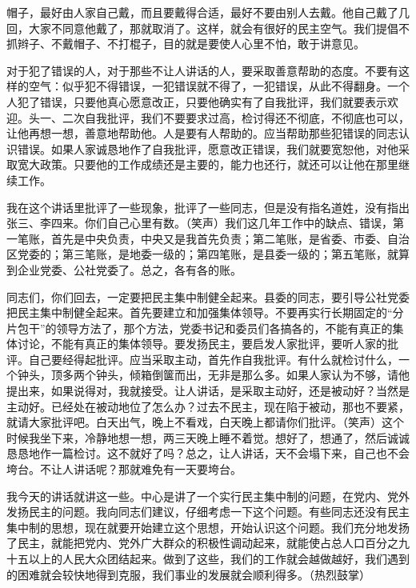 帽子，最好由人家自己戴，而且要戴得合适，最好不要由别人去戴。他自己戴了几回，大家不同意他戴了，那就取消了。这样，就会有很好的民主空气。我们提倡不抓辫子、不戴帽子、不打棍子，目的就是要使人心里不怕，敢于讲意见。

对于犯了错误的人，对于那些不让人讲话的人，要采取善意帮助的态度。不要有这样的空气：似乎犯不得错误，一犯错误就不得了，一犯错误，从此不得翻身。一个人犯了错误，只要他真心愿意改正，只要他确实有了自我批评，我们就要表示欢迎。头一、二次自我批评，我们不要要求过高，检讨得还不彻底，不彻底也可以，让他再想一想，善意地帮助他。人是要有人帮助的。应当帮助那些犯错误的同志认识错误。如果人家诚恳地作了自我批评，愿意改正错误，我们就要宽恕他，对他采取宽大政策。只要他的工作成绩还是主要的，能力也还行，就还可以让他在那里继续工作。

我在这个讲话里批评了一些现象，批评了一些同志，但是没有指名道姓，没有指出张三、李四来。你们自己心里有数。（笑声）我们这几年工作中的缺点、错误，第一笔账，首先是中央负责，中央又是我首先负责；第二笔账，是省委、市委、自治区党委的；第三笔账，是地委一级的；第四笔账，是县委一级的；第五笔账，就算到企业党委、公社党委了。总之，各有各的账。

同志们，你们回去，一定要把民主集中制健全起来。县委的同志，要引导公社党委把民主集中制健全起来。首先要建立和加强集体领导。不要再实行长期固定的“分片包干”的领导方法了，那个方法，党委书记和委员们各搞各的，不能有真正的集体讨论，不能有真正的集体领导。要发扬民主，要启发人家批评，要听人家的批评。自己要经得起批评。应当采取主动，首先作自我批评。有什么就检讨什么，一个钟头，顶多两个钟头，倾箱倒箧而出，无非是那么多。如果人家认为不够，请他提出来，如果说得对，我就接受。让人讲话，是采取主动好，还是被动好？当然是主动好。已经处在被动地位了怎么办？过去不民主，现在陷于被动，那也不要紧，就请大家批评吧。白天出气，晚上不看戏，白天晚上都请你们批评。（笑声）这个时候我坐下来，冷静地想一想，两三天晚上睡不着觉。想好了，想通了，然后诚诚恳恳地作一篇检讨。这不就好了吗？总之，让人讲话，天不会塌下来，自己也不会垮台。不让人讲话呢？那就难免有一天要垮台。

我今天的讲话就讲这一些。中心是讲了一个实行民主集中制的问题，在党内、党外发扬民主的问题。我向同志们建议，仔细考虑一下这个问题。有些同志还没有民主集中制的思想，现在就要开始建立这个思想，开始认识这个问题。我们充分地发扬了民主，就能把党内、党外广大群众的积极性调动起来，就能使占总人口百分之九十五以上的人民大众团结起来。做到了这些，我们的工作就会越做越好，我们遇到的困难就会较快地得到克服，我们事业的发展就会顺利得多。（热烈鼓掌）

